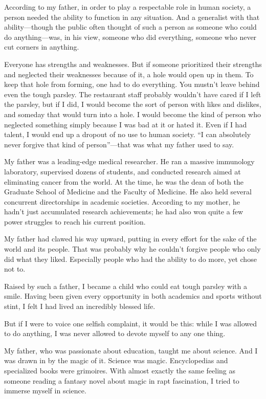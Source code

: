 \documentclass[
    a4paper,
    12pt,
    twoside,
    openany,
    UTF8,
    fontset=windows
]{ctexbook}
\begin{document}
According to my father, in order to play a respectable role in human society, a person needed the ability to function in any situation. And a generalist with that ability---though the public often thought of such a person as someone who could do anything---was, in his view, someone who did everything, someone who never cut corners in anything.

Everyone has strengths and weaknesses. But if someone prioritized their strengths and neglected their weaknesses because of it, a hole would open up in them. To keep that hole from forming, one had to do everything. You mustn't leave behind even the tough parsley. The restaurant staff probably wouldn't have cared if I left the parsley, but if I did, I would become the sort of person with likes and dislikes, and someday that would turn into a hole. I would become the kind of person who neglected something simply because I was bad at it or hated it. Even if I had talent, I would end up a dropout of no use to human society. ``I can absolutely never forgive that kind of person''---that was what my father used to say.

My father was a leading-edge medical researcher. He ran a massive immunology laboratory, supervised dozens of students, and conducted research aimed at eliminating cancer from the world. At the time, he was the dean of both the Graduate School of Medicine and the Faculty of Medicine. He also held several concurrent directorships in academic societies. According to my mother, he hadn't just accumulated research achievements; he had also won quite a few power struggles to reach his current position.

My father had clawed his way upward, putting in every effort for the sake of the world and its people. That was probably why he couldn't forgive people who only did what they liked. Especially people who had the ability to do more, yet chose not to.

Raised by such a father, I became a child who could eat tough parsley with a smile. Having been given every opportunity in both academics and sports without stint, I felt I had lived an incredibly blessed life.

But if I were to voice one selfish complaint, it would be this: while I was allowed to do anything, I was never allowed to devote myself to any one thing.

My father, who was passionate about education, taught me about science. And I was drawn in by the magic of it. Science was magic. Encyclopedias and specialized books were grimoires. With almost exactly the same feeling as someone reading a fantasy novel about magic in rapt fascination, I tried to immerse myself in science.
\end{document}
